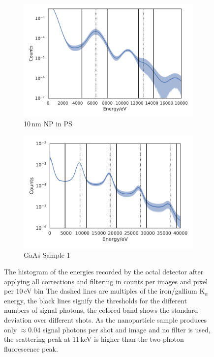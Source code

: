 \begin{figure}
	\centering
	\begin{subfigure}[b]{0.49\textwidth}
		\includegraphics[width=\linewidth]{images/spectrum_nano.pdf}
			\caption {10\,nm NP in PS}
			\label{fig:spectrum_nano}
	\end{subfigure}
	\begin{subfigure}[b]{0.49\textwidth}
		\includegraphics[width=\linewidth]{images/spectrum_gaas1.pdf}
		\caption{GaAs Sample 1}
		\label{fig:spectrum_gaas}
	\end{subfigure}
	\caption[Spectrum on the Detector for Nanoparticle and  GaAs samples]{The histogram of the energies recorded by the octal detector after applying all corrections and filtering in counts per images and pixel per 10\,eV bin  The dashed lines are multiples of the iron/gallium K$_\alpha$ energy, the black lines signify the thresholds for the different numbers of signal photons, the colored band shows the standard deviation over different shots. As the nanoparticle sample produces only $\approx 0.04$ signal photons per shot and image and no filter is used, the scattering peak at 11\,keV is higher than the two-photon fluorescence peak.}

\end{figure}

